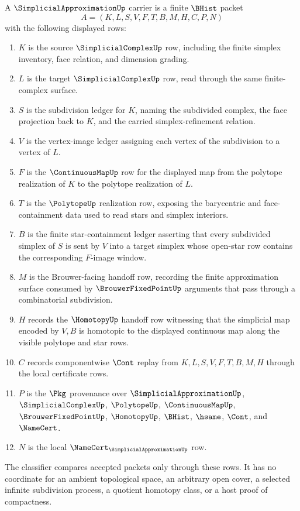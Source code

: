 \begin{definition}
\label{def:simplicial-approximation-carrier}
A $\SimplicialApproximationUp$ carrier is a finite $\BHist$ packet
$$
A=(K,L,S,V,F,T,B,M,H,C,P,N)
$$
with the following displayed rows:
\begin{enumerate}
\item $K$ is the source $\SimplicialComplexUp$ row, including the finite simplex inventory, face relation, and dimension grading.
\item $L$ is the target $\SimplicialComplexUp$ row, read through the same finite-complex surface.
\item $S$ is the subdivision ledger for $K$, naming the subdivided complex, the face projection back to $K$, and the carried simplex-refinement relation.
\item $V$ is the vertex-image ledger assigning each vertex of the subdivision to a vertex of $L$.
\item $F$ is the $\ContinuousMapUp$ row for the displayed map from the polytope realization of $K$ to the polytope realization of $L$.
\item $T$ is the $\PolytopeUp$ realization row, exposing the barycentric and face-containment data used to read stars and simplex interiors.
\item $B$ is the finite star-containment ledger asserting that every subdivided simplex of $S$ is sent by $V$ into a target simplex whose open-star row contains the corresponding $F$-image window.
\item $M$ is the Brouwer-facing handoff row, recording the finite approximation surface consumed by $\BrouwerFixedPointUp$ arguments that pass through a combinatorial subdivision.
\item $H$ records the $\HomotopyUp$ handoff row witnessing that the simplicial map encoded by $V,B$ is homotopic to the displayed continuous map along the visible polytope and star rows.
\item $C$ records componentwise $\Cont$ replay from $K,L,S,V,F,T,B,M,H$ through the local certificate rows.
\item $P$ is the $\Pkg$ provenance over $\SimplicialApproximationUp$, $\SimplicialComplexUp$, $\PolytopeUp$, $\ContinuousMapUp$, $\BrouwerFixedPointUp$, $\HomotopyUp$, $\BHist$, $\hsame$, $\Cont$, and $\NameCert$.
\item $N$ is the local $\NameCert_{\SimplicialApproximationUp}$ row.
\end{enumerate}
The classifier compares accepted packets only through these rows. It has no coordinate for an ambient topological space, an arbitrary open cover, a selected infinite subdivision process, a quotient homotopy class, or a host proof of compactness.
\end{definition}

